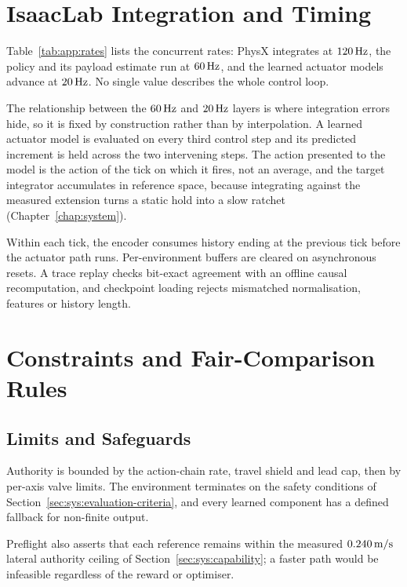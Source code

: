 \section{IsaacLab Integration and Timing}
\label{sec:ctrl:integration}

Table~\ref{tab:app:rates} lists the concurrent rates: PhysX integrates at
$\unit[120]{Hz}$, the policy and its payload estimate run at $\unit[60]{Hz}$, and the
learned actuator models advance at $\unit[20]{Hz}$. No single value describes
the whole control loop.

The relationship between the $\unit[60]{Hz}$ and $\unit[20]{Hz}$ layers is where
integration errors hide, so it is fixed by construction rather than by
interpolation. A learned actuator model is evaluated on every third control step
and its predicted increment is held across the two intervening steps. The action
presented to the model is the action of the tick on which it fires, not an
average, and the target integrator accumulates in reference space, because
integrating against the measured extension turns a static hold into a slow
ratchet (Chapter~\ref{chap:system}).

Within each tick, the encoder consumes history ending at the previous tick before
the actuator path runs. Per-environment buffers are cleared on asynchronous
resets. A trace replay checks bit-exact agreement with an offline causal
recomputation, and checkpoint loading rejects mismatched normalisation,
features or history length.

\section{Constraints and Fair-Comparison Rules}
\label{sec:ctrl:constraints}

\subsection{Limits and Safeguards}

Authority is bounded by the action-chain rate, travel shield and lead cap, then
by per-axis valve limits. The environment terminates on the safety conditions of
Section~\ref{sec:sys:evaluation-criteria}, and every learned component has a
defined fallback for non-finite output.

Preflight also asserts that each reference remains within the measured
$\unit[0.240]{m/s}$ lateral authority ceiling of
Section~\ref{sec:sys:capability}; a faster path would be infeasible regardless of
the reward or optimiser.

